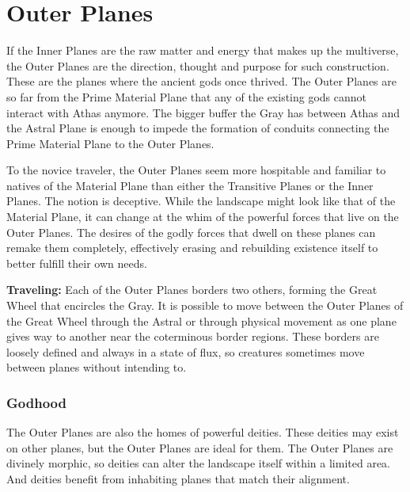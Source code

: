 \section{Outer Planes}
If the Inner Planes are the raw matter and energy that makes up the multiverse, the Outer Planes are the direction, thought and purpose for such construction. 
These are the planes where the ancient gods once thrived. The Outer Planes are so far from the Prime Material Plane that any of the existing gods cannot interact with Athas anymore. The bigger buffer the Gray has between Athas and the Astral Plane is enough to impede the formation of conduits connecting the Prime Material Plane to the Outer Planes.


To the novice traveler, the Outer Planes seem more hospitable and familiar to natives of the Material Plane than either the Transitive Planes or the Inner Planes. The notion is deceptive. While the landscape might look like that of the Material Plane, it can change at the whim of the powerful forces that live on the Outer Planes. The desires of the godly forces that dwell on these planes can remake them completely, effectively erasing and rebuilding existence itself to better fulfill their own needs.

\textbf{Traveling:} Each of the Outer Planes borders two others, forming the Great Wheel that encircles the Gray. It is possible to move between the Outer Planes of the Great Wheel through the Astral or through physical movement as one plane gives way to another near the coterminous border regions. These borders are loosely defined and always in a state of flux, so creatures sometimes move between planes without intending to.

\subsubsection{Godhood}
The Outer Planes are also the homes of powerful deities. These deities may exist on other planes, but the Outer Planes are ideal for them. The Outer Planes are divinely morphic, so deities can alter the landscape itself within a limited area. And deities benefit from inhabiting planes that match their alignment.

